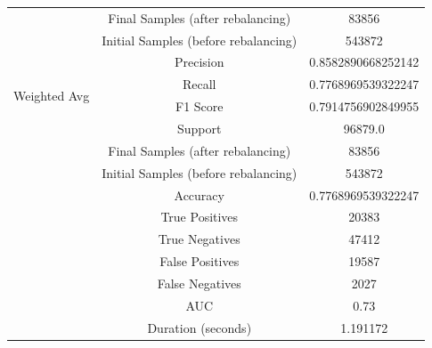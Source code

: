 \begin{longtable}{|c|c|c|}
 & Final Samples (after rebalancing) & 83856 \\
 & Initial Samples (before rebalancing) & 543872 \\
\hline
\multirow{4}{*}{Weighted Avg} & Precision & 0.8582890668252142 \\
 & Recall & 0.7768969539322247 \\
 & F1 Score & 0.7914756902849955 \\
 & Support & 96879.0 \\
 & Final Samples (after rebalancing) & 83856 \\
 & Initial Samples (before rebalancing) & 543872 \\
\hline
& Accuracy & 0.7768969539322247 \\ \hline
& True Positives & 20383 \\ \hline
& True Negatives & 47412 \\ \hline
& False Positives & 19587 \\ \hline
& False Negatives & 2027 \\ \hline
& AUC & 0.73 \\ \hline
& Duration (seconds) & 1.191172 \\ \hline
\end{longtable}


